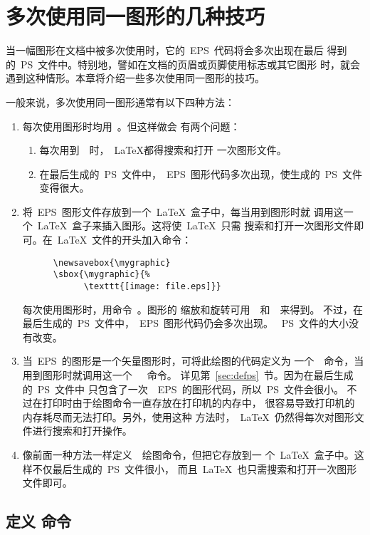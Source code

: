 \section{多次使用同一图形的几种技巧}\label{sec:multigraph}

当一幅图形在文档中被多次使用时，它的~EPS~代码将会多次出现在最后
得到的~PS~文件中。特别地，譬如在文档的页眉或页脚使用标志或其它图形
时，就会遇到这种情形。本章将介绍一些多次使用同一图形的技巧。

一般来说，多次使用同一图形通常有以下四种方法：
\begin{enumerate}
\item 每次使用图形时均用~。但这样做会
      有两个问题：
     \begin{enumerate}
     \item 每次用到~~时，~\LaTeX{}都得搜索和打开
           一次图形文件。
     \item 在最后生成的~PS~文件中，~EPS~图形代码多次出现，使生成的~PS~文件
           变得很大。
     \end{enumerate}
\item 将~EPS~图形文件存放到一个~\LaTeX{}~盒子中，每当用到图形时就
      调用这一个~\LaTeX{}~盒子来插入图形。这将使~\LaTeX{}~只需
      搜索和打开一次图形文件即可。在~\LaTeX{}~文件的开头加入命令：
      \begin{Verbatim}
      \newsavebox{\mygraphic}
      \sbox{\mygraphic}{%
            \texttt{[image: file.eps]}}
      \end{Verbatim}
      每次使用图形时，用命令~。图形的
      缩放和旋转可用~~和~~来得到。
      不过，在最后生成的~PS~文件中，~EPS~图形代码仍会多次出现。
      ~PS~文件的大小没有改变。
\item 当~EPS~的图形是一个矢量图形时，可将此绘图的代码定义为
      一个~\PS~命令，当用到图形时就调用这一个~~\PS~命令。
      详见第~\ref{sec:defps}~节。因为在最后生成的~PS~文件中
      只包含了一次~~EPS~的图形代码，所以~PS~文件会很小。
      不过在打印时由于绘图命令一直存放在打印机的内存中，
      很容易导致打印机的内存耗尽而无法打印。另外，使用这种
      方法时，~\LaTeX{}~仍然得每次对图形文件进行搜索和打开操作。
\item 像前面一种方法一样定义~\PS~绘图命令，但把它存放到一
      个~\LaTeX{}~盒子中。这样不仅最后生成的~PS~文件很小，
      而且~\LaTeX{}~也只需搜索和打开一次图形文件即可。
\end{enumerate}

\subsection{定义 \PS{} 命令}\label{ssec:defps}

